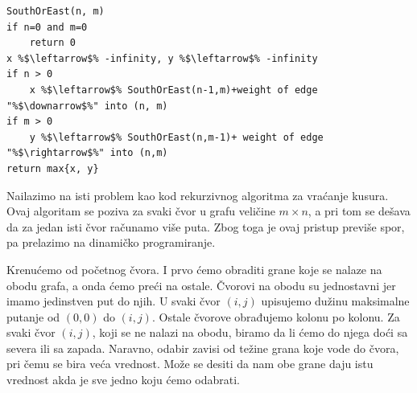 \begin{lstlisting}
SouthOrEast(n, m)
if n=0 and m=0
    return 0
x %$\leftarrow$% -infinity, y %$\leftarrow$% -infinity
if n > 0
    x %$\leftarrow$% SouthOrEast(n-1,m)+weight of edge "%$\downarrow$%" into (n, m)
if m > 0
    y %$\leftarrow$% SouthOrEast(n,m-1)+ weight of edge "%$\rightarrow$%" into (n,m)
return max{x, y}
\end{lstlisting}

\noindent Nailazimo na isti problem kao kod rekurzivnog algoritma za vraćanje kusura. Ovaj algoritam se poziva za svaki čvor u grafu veličine $m\times n$, a pri tom se dešava da za jedan isti čvor računamo više puta. Zbog toga je ovaj pristup previše spor, pa prelazimo na dinamičko programiranje.

Krenućemo od početnog čvora. I prvo ćemo obraditi grane koje se nalaze na obodu grafa, a onda ćemo preći na ostale. Čvorovi na obodu su jednostavni jer imamo jedinstven put do njih. U svaki čvor $(i, j)$ upisujemo dužinu maksimalne putanje od $(0,0)$ do $(i,j)$. Ostale čvorove obrađujemo kolonu po kolonu. Za svaki čvor $(i, j)$, koji se ne nalazi na obodu, biramo da li ćemo do njega doći sa severa ili sa zapada. Naravno, odabir zavisi od težine grana koje vode do čvora, pri čemu se bira veća vrednost. Može se desiti da nam obe grane daju istu vrednost akda je sve jedno koju ćemo odabrati.


